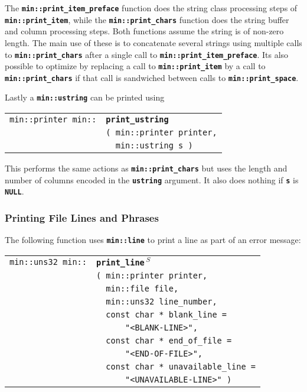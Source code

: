 \documentclass[12pt]{article}
\makeatletter
\newcommand{\TT}[1]{{\tt \bfseries #1}}
\newcommand{\ttindex}[1]{\index{#1@{\tt #1}}}
\newcommand{\EOL}{\penalty \exhyphenpenalty}
\newenvironment{indpar}[1][0.3in]%
	{\begin{list}{}%
		     {\setlength{\itemsep}{0in}%
		      \setlength{\topsep}{0in}%
		      \setlength{\parsep}{1ex}%
		      \setlength{\labelwidth}{#1}%
		      \setlength{\leftmargin}{#1}%
		      \addtolength{\leftmargin}{\labelsep}}%
	 \item}%
	{\end{list}}
\newcommand{\LABEL}[1]{\label{#1}}
\newlength{\ARGBREAKLENGTH}
\newcommand{\ARGBREAK}[1][\ARGBREAKLENGTH]{\\&\hspace*{#1}}
\newcommand{\MINKEY}[1]%
	   {\TT{#1}\ttindex{min::#1}\ttindex{#1}}
\newcommand{\RESIZE}{$\,^S$}
\makeatother
\begin{document}
The \TT{min::print\_item\_preface} function does the string class
processing steps of \TT{min::\EOL print\_\EOL item}, while the
\TT{min::print\_\EOL chars} function does the string buffer and column
processing steps.  Both functions assume the string is of non-zero
length.  The main use of these is to concatenate several strings
using multiple calls to \TT{min::\EOL print\_\EOL chars} after a
single call to \TT{min::\EOL print\_\EOL item\_\EOL preface}.
Its also possible to optimize by replacing a call to
\TT{min::\EOL print\_\EOL item} by a call to
\TT{min::\EOL print\_\EOL chars} if that call is sandwiched between
calls to \TT{min::\EOL print\_\EOL space}.

Lastly a \TT{min::ustring} can be printed using

\begin{indpar}[1em]\begin{tabular}{r@{}l}
\verb|min::printer min::| & \MINKEY{print\_ustring}\ARGBREAK
    \verb|( min::printer printer,|\ARGBREAK
    \verb|  min::ustring s )|
\LABEL{MIN::PRINT_USTRING} \\
\end{tabular}\end{indpar}

This performs the same actions as \TT{min::print\_chars} but
uses the length and number of columns encoded in the
\TT{ustring} argument.  It also does nothing if \TT{s} is \TT{NULL}.


\subsubsection{Printing File Lines and Phrases}
\label{PRINTING-FILE-LINES-AND-PHRASES}

The following function uses \TT{min::line} to print a line as part of
an error message:

\begin{indpar}[1em]\begin{tabular}{r@{}l}
\verb|min::uns32 min::|
    & \MINKEY{print\_\EOL line\RESIZE}\ARGBREAK
      \verb|( min::printer printer,|\ARGBREAK
      \verb|  min::file file,|\ARGBREAK
      \verb|  min::uns32 line_number,|\ARGBREAK
      \verb|  const char * blank_line =|\ARGBREAK
      \verb|      "<BLANK-LINE>",|\ARGBREAK
      \verb|  const char * end_of_file =|\ARGBREAK
      \verb|      "<END-OF-FILE>",|\ARGBREAK
      \verb|  const char * unavailable_line =|\ARGBREAK
      \verb|      "<UNAVAILABLE-LINE>" )|
\LABEL{MIN::PRINT_LINE} \\
\end{tabular}\end{indpar}
\end{document}
